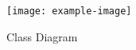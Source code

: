 
\begin{figure}[p]
	\caption{Class Diagram}
	\centering
	\texttt{[image: example-image]}
	\label{fig:dia:class}
\end{figure}